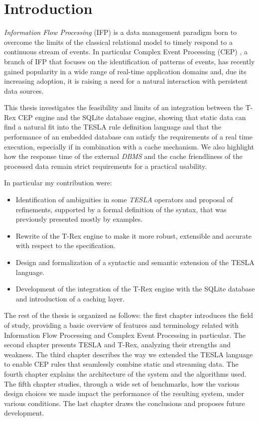 \chapter*{Introduction}

\emph{Information Flow Processing} (IFP) \cite{ifp-survey} is a data management paradigm born to overcome the limits of the classical relational model to timely respond to a continuous stream of events. In particular Complex Event Processing (CEP) \cite{cep-book}, a branch of IFP that focuses on the identification of patterns of events, has recently gained popularity in a wide range of real-time application domains and, due its increasing adoption, it is raising a need for a natural interaction with persistent data sources.

This thesis investigates the feasibility and limits of an integration between the T-Rex CEP engine and the SQLite database engine, showing that static data can find a natural fit into the TESLA rule definition language and that the performance of an embedded database can satisfy the requirements of a real time execution, especially if in combination with a cache mechanism. We also highlight how the response time of the external \emph{DBMS} and the cache friendliness of the processed data remain strict requirements for a practical usability.

In particular my contribution were:
\begin{itemize}
\setlength\itemsep{0em}
\item Identification of ambiguities in some \emph{TESLA} \cite{tesla} operators and proposal of refinements, supported by a formal definition of the syntax, that was previously presented mostly by examples.
\item Rewrite of the T-Rex engine to make it more robust, extensible and accurate with respect to the specification.
\item Design and formalization of a syntactic and semantic extension of the TESLA language.
\item Development of the integration of the T-Rex engine with the SQLite database and introduction of a caching layer.
\end{itemize}

The rest of the thesis is organized as follows: the first chapter introduces the field of study, providing a basic overview of features and terminology related with Information Flow Processing and Complex Event Processing in particular. The second chapter presents TESLA and T-Rex, analyzing their strengths and weakness. The third chapter describes the way we extended the TESLA language to enable CEP rules that seamlessly combine static and streaming data. The fourth chapter explains the architecture of the system and the algorithms used. The fifth chapter studies, through a wide set of benchmarks, how the various design choices we made impact the performance of the resulting system, under various conditions. The last chapter draws the conclusions and proposes future development.

